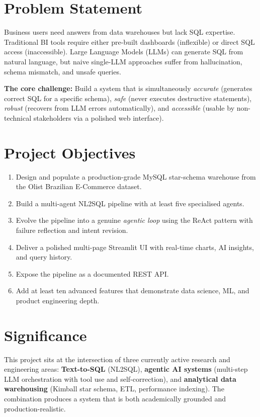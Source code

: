 \documentclass[12pt,a4paper]{report}
\begin{document}
\section{Problem Statement}

Business users need answers from data warehouses but lack SQL expertise. Traditional BI tools
require either pre-built dashboards (inflexible) or direct SQL access (inaccessible). Large
Language Models (LLMs) can generate SQL from natural language, but naive single-LLM approaches
suffer from hallucination, schema mismatch, and unsafe queries.

\textbf{The core challenge:} Build a system that is simultaneously \emph{accurate} (generates
correct SQL for a specific schema), \emph{safe} (never executes destructive statements),
\emph{robust} (recovers from LLM errors automatically), and \emph{accessible} (usable by
non-technical stakeholders via a polished web interface).

\section{Project Objectives}

\begin{enumerate}[leftmargin=*]
  \item Design and populate a production-grade MySQL star-schema warehouse from the Olist
        Brazilian E-Commerce dataset.
  \item Build a multi-agent NL2SQL pipeline with at least five specialised agents.
  \item Evolve the pipeline into a genuine \emph{agentic loop} using the ReAct pattern with
        failure reflection and intent revision.
  \item Deliver a polished multi-page Streamlit UI with real-time charts, AI insights, and
        query history.
  \item Expose the pipeline as a documented REST API.
  \item Add at least ten advanced features that demonstrate data science, ML, and product
        engineering depth.
\end{enumerate}

\section{Significance}

This project sits at the intersection of three currently active research and engineering areas:
\textbf{Text-to-SQL} (NL2SQL), \textbf{agentic AI systems} (multi-step LLM orchestration with
tool use and self-correction), and \textbf{analytical data warehousing} (Kimball star schema,
ETL, performance indexing). The combination produces a system that is both academically grounded
and production-realistic.
\end{document}
